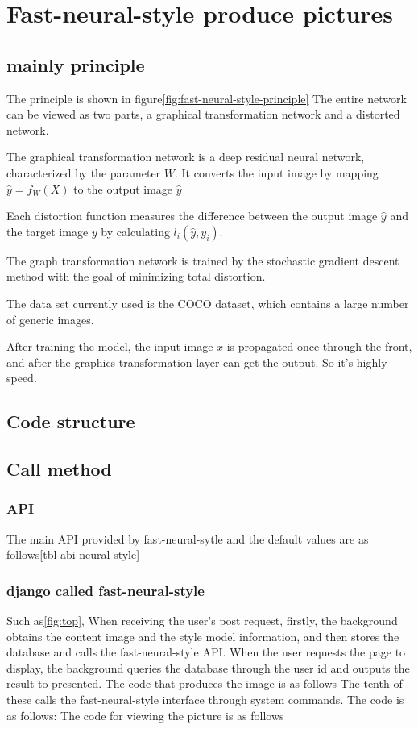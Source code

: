 \section{Fast-neural-style produce pictures}
\subsection{mainly principle}
The principle is shown in figure\ref{fig:fast-neural-style-principle}
The entire network can be viewed as two parts, a graphical transformation network and a distorted network.

The graphical transformation network is a deep residual neural network, characterized by the parameter $W$. It converts the input image by mapping $\hat y=f_W(X)$ to the output image $\hat y$

Each distortion function measures the difference between the output image $\hat y$ and the target image $y$ by calculating $l_i(\hat y,y_i)$.

The graph transformation network is trained by the stochastic gradient descent method with the goal of minimizing total distortion.

The data set currently used is the COCO dataset, which contains a large number of generic images.

After training the model, the input image $x$ is propagated once through the front, and after the graphics transformation layer can get the output. So it's highly speed.
\subsection{Code structure}

\subsection{Call method}

\subsubsection{API}
The main API provided by fast-neural-sytle and the default values are as follows\ref{tbl-abi-neural-style}
\subsubsection{django called fast-neural-style}
Such as\ref{fig:top}, When receiving the user's post request, firstly, the background obtains the content image and the style model information, and then stores the database and calls the fast-neural-style API. When the user requests the page to display, the background queries the database through the user id and outputs the result to presented.
The code that produces the image is as follows
The tenth of these calls the fast-neural-style interface through system commands. The code is as follows:
The code for viewing the picture is as follows
